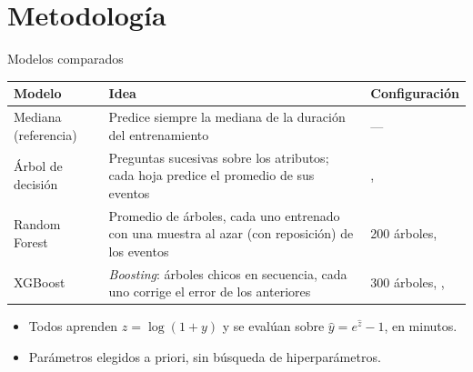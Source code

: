 \documentclass[aspectratio=169,10pt]{beamer}
\begin{document}
\section{Metodología}
\begin{frame}{Modelos comparados}
  \begingroup\small
  \renewcommand{\arraystretch}{1.35}
  \begin{tabularx}{\textwidth}{@{}L{2.9cm}YL{4.6cm}@{}}
    \toprule
    \textbf{Modelo} & \textbf{Idea} & \textbf{Configuración} \\
    \midrule
    Mediana (referencia) & Predice siempre la mediana de la duración del entrenamiento & --- \\
    Árbol de decisión & Preguntas sucesivas sobre los atributos; cada hoja predice el promedio de sus eventos & ,  \\
    Random Forest & Promedio de árboles, cada uno entrenado con una muestra al azar (con reposición) de los eventos & 200 árboles,  \\
    XGBoost & \emph{Boosting}: árboles chicos en secuencia, cada uno corrige el error de los anteriores & 300 árboles, ,  \\
    \bottomrule
  \end{tabularx}\endgroup
  \vspace{0.3cm}
  \begin{itemize}\small\setlength{\itemsep}{2pt}
    \item Todos aprenden $z=\log(1+y)$ y se evalúan sobre $\hat{y}=e^{\hat{z}}-1$, en minutos.
    \item Parámetros elegidos a priori, sin búsqueda de hiperparámetros.
  \end{itemize}
\end{frame}
\end{document}
